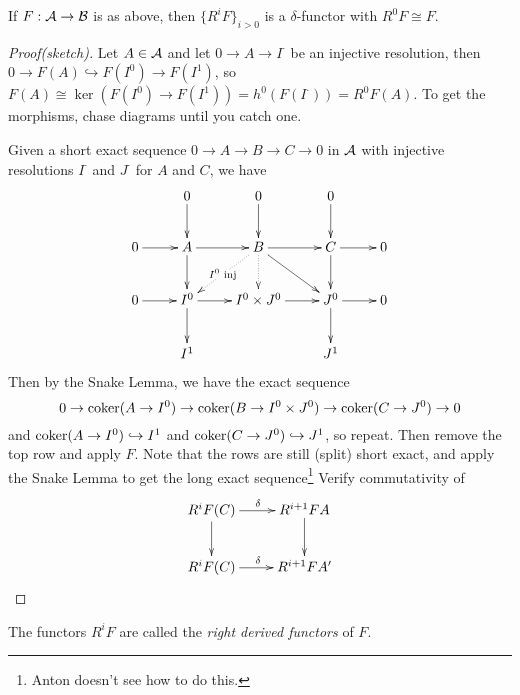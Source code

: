 \begin{theorem}\label{T:lec2thm}
If $F:\mathcal{A} \to \mathcal{B}$ is as above, then $\{R^iF\}_{i>0}$ is a
$\delta$-functor with $R^0F\cong F$.
\end{theorem}
\begin{proof}[Proof(sketch)]
 Let $A\in \mathcal{A}$ and let $0\to A\to I^{\cdot}$ be an injective
 resolution, then $0\to F(A)\hookrightarrow F(I^0)\to F(I^1)$, so $F(A)\cong
 \ker(F(I^0)\to F(I^1)) = h^0(F(I^{\cdot}))=R^0F(A)$.  To get the
 morphisms, chase diagrams until you catch one.

 Given a short exact sequence $0\to A\to B \to C\to 0$ in $\mathcal{A}$
 with injective resolutions $I^{\cdot}$ and $J^{\cdot}$ for $A$
 and $C$, we have
 \[\xymatrix{
 & 0\ar[d] & 0\ar[d] & 0\ar[d]\\
 0\ar[r] &A\ar[r]\ar[d] & B\ar[r]\ar@{.>}[d]\ar@{.>}[dl]|{I^0\text{
 inj}} \ar[dr] & C\ar[r]\ar[d] & 0\\
 0\ar[r]& I^0\ar[r]\ar[d] & I^0\times J^0 \ar[r] & J^0 \ar[r]
 \ar[d] & 0\\
 & I^1 & & J^1
} \]
 Then by the Snake Lemma, we have the exact sequence
 \[
    0\to \text{\rm coker}(A\to I^0)\to \text{\rm coker}(B\to I^0\times J^0) \to
    \text{\rm coker}(C\to J^0)\to 0
 \]
 and $\text{\rm coker}(A\to I^0) \hookrightarrow I^1$ and $\text{\rm coker}(C\to
 J^0)\hookrightarrow J^1$, so repeat.  Then remove the top row and
 apply $F$.  Note that the rows are still (split) short exact, and
 apply the Snake Lemma to get the long exact sequence\footnote{Anton
 doesn't see how to do this.} Verify commutativity of
 \[\xymatrix{
    R^iF(C)\ar[d]\ar[r]^{\delta} & R^{i+1}F{A}\ar[d]\\
    R^iF(C)\ar[r]^{\delta} & R^{i+1}F{A'}\\
 }\]
\end{proof}
The functors $R^iF$ are called the \emph{right derived functors}
of $F$.

